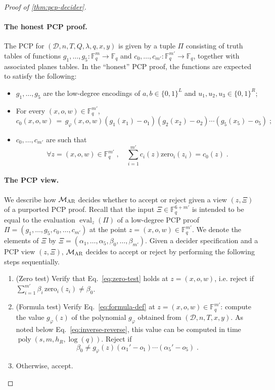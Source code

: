 \documentclass[11pt]{article}
\theoremstyle{definition}
\newcommand{\F}{\ensuremath{\mathbb{F}}}
\DeclareMathOperator{\poly}{poly}
\newcommand{\decider}{\mathcal{D}}
\newcommand{\gamestyle}[1]{\ensuremath{\textsc{#1}}\xspace}
\newcommand{\ar}{\gamestyle{AR}}
\newcommand{\zero}{\mathrm{zero}}
\newcommand{\pcpeval}{\Xi}
\newcommand{\pcpverifier}{\mathcal{M}_\ar}
\newcommand{\qlen}{Q}
\DeclareMathOperator{\ev}{eval}
\begin{document}
\begin{proof}[Proof of \cref{thm:pcp-decider}]
  \paragraph{The honest PCP proof.}
  The PCP for $(\decider, n, T, \qlen,\lambda, q, x, y)$ is given by a tuple
  $\Pi$ consisting of truth tables of functions $g_1, \dots, g_5:\F_q^m\to\F_q$
  and $c_0,\ldots,c_{m'}:\F_q^{m'}\to \F_q$, together with associated planes
  tables.
  In the ``honest'' PCP proof, the functions are expected to satisfy the
  following:
  \begin{itemize}
  \item $g_1, \ldots, g_5$ are the low-degree encodings of $a, b \in \{0, 1\}^L$
    and $u_1, u_2, u_3 \in \{0, 1\}^R$;
  \item For every $(x,o, w)\in \F_q^{m'}$,
    \begin{equation}
      \label{eq:formula-def}
      c_0(x,o, w)\,=\,g_\varphi(x,o,w) (g_1(x_1) - o_1) (g_2(x_2) - o_2)
      \cdots (g_5(x_5)-o_5)\;;
    \end{equation}
  \item $c_0,\ldots,c_{m'}$ are such that
    \begin{equation}\label{eq:zero-test}
      \forall z=(x,o, w)\in \F_q^{m'}\;,\quad
      \sum_{i=1}^{m'} c_i(z)\mathrm{zero}_i(z_i) = c_0(z)\;.
    \end{equation}
  \end{itemize}

  \paragraph{The PCP view.}
  We describe how $\pcpverifier$ decides whether to accept or reject given a
  view $(z, \pcpeval)$ of a purported PCP proof.
  Recall that the input $\pcpeval \in \F_q^{6 + m'}$ is intended to be equal to
  the evaluation $\ev_{z}(\Pi)$ of a low-degree PCP proof $\Pi = (g_1, \ldots,
  g_5,c_0,\ldots,c_{m'})$ at the point $z = (x, o, w) \in \F_q^{m'}$.
  We denote the elements of $\pcpeval$ by $\pcpeval = (\alpha_1, \dots,
  \alpha_5, \beta_0, \dots, \beta_{m'})$.
  Given a decider specification and a PCP view $(z, \pcpeval)$, $\pcpverifier$
  decides to accept or reject by performing the following steps sequentially.
  \begin{enumerate}
  \item (Zero test) Verify that Eq.~\eqref{eq:zero-test} holds
    at $z = (x,o,w)$, i.e. reject if
    $\sum_{i=1}^{m'} \beta_i \,\zero_i(z_i)\neq \beta_0$. \label{enu:ar-zero-test}
  \item (Formula test)
    \label{enu:ar-formula-test}
    Verify Eq.~\eqref{eq:formula-def} at $z = (x,o, w)\in
    \F_q^{m'}$: compute the value $g_\varphi(z)$ of the
    polynomial $g_\varphi$ obtained from $(\decider, n, T, x,
    y)$. As noted below Eq.~\eqref{eq:inverse-reverse}, this value can be
    computed in time $\poly(s, m, h_R, \log(q))$. Reject if
    \[ \beta_0 \neq g_\varphi(z) (\alpha_1' - o_1)\cdots
      (\alpha_5' - o_5)\;. \]
  \item Otherwise, accept.
  \end{enumerate}


\end{proof}
\end{document}
